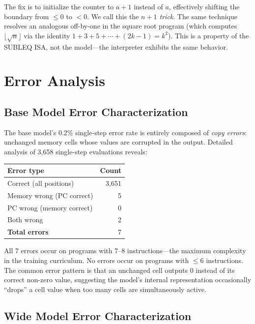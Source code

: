 \documentclass[11pt,a4paper]{article}
\begin{document}
The fix is to initialize the counter to $a + 1$ instead of $a$, effectively shifting the boundary from $\leq 0$ to $< 0$.
We call this the \emph{$n{+}1$ trick}.
The same technique resolves an analogous off-by-one in the square root program (which computes $\lfloor\sqrt{n}\rfloor$ via the identity $1 + 3 + 5 + \cdots + (2k{-}1) = k^2$).
This is a property of the SUBLEQ ISA, not the model---the interpreter exhibits the same behavior.

\section{Error Analysis}
\label{sec:errors}

\subsection{Base Model Error Characterization}

The base model's 0.2\% single-step error rate is entirely composed of \emph{copy errors}: unchanged memory cells whose values are corrupted in the output.
Detailed analysis of 3{,}658 single-step evaluations reveals:

\begin{center}
\begin{tabular}{lr}
\toprule
\textbf{Error type} & \textbf{Count} \\
\midrule
Correct (all positions) & 3{,}651 \\
Memory wrong (PC correct) & 5 \\
PC wrong (memory correct) & 0 \\
Both wrong & 2 \\
\midrule
\textbf{Total errors} & 7 \\
\bottomrule
\end{tabular}
\end{center}

All 7 errors occur on programs with 7--8 instructions---the maximum complexity in the training curriculum.
No errors occur on programs with $\leq 6$ instructions.
The common error pattern is that an unchanged cell outputs 0 instead of its correct non-zero value, suggesting the model's internal representation occasionally ``drops'' a cell value when too many cells are simultaneously active.

\subsection{Wide Model Error Characterization}
\end{document}
